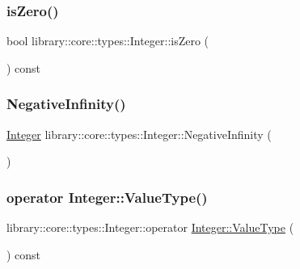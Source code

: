 \subsubsection{\texorpdfstring{is\+Zero()}{isZero()}}
{\footnotesize\ttfamily bool library\+::core\+::types\+::\+Integer\+::is\+Zero (\begin{DoxyParamCaption}{ }\end{DoxyParamCaption}) const}

\mbox{\label{classlibrary_1_1core_1_1types_1_1Integer_aa8151c3b615012ec215d20da6de593bd}} 
\subsubsection{\texorpdfstring{Negative\+Infinity()}{NegativeInfinity()}}
{\footnotesize\ttfamily \hyperlink{classlibrary_1_1core_1_1types_1_1Integer}{Integer} library\+::core\+::types\+::\+Integer\+::\+Negative\+Infinity (\begin{DoxyParamCaption}{ }\end{DoxyParamCaption})\hspace{0.3cm}{\ttfamily [static]}}

\mbox{\label{classlibrary_1_1core_1_1types_1_1Integer_ad1cf430796727e18440d50d4764b2792}} 
\subsubsection{\texorpdfstring{operator Integer\+::\+Value\+Type()}{operator Integer::ValueType()}}
{\footnotesize\ttfamily library\+::core\+::types\+::\+Integer\+::operator \hyperlink{classlibrary_1_1core_1_1types_1_1Integer_a623afb1580f870fd8a1997b1c12c917d}{Integer\+::\+Value\+Type} (\begin{DoxyParamCaption}{ }\end{DoxyParamCaption}) const}

